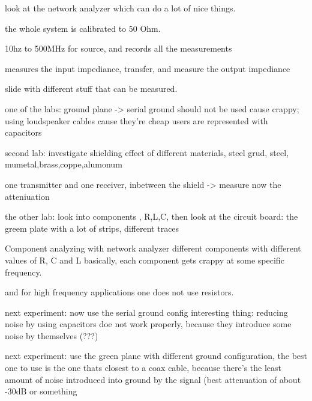 




look at the network analyzer which can do a lot of nice things.

the whole system is calibrated to 50 Ohm.

10hz to 500MHz for source, and records all the measurements

measures the input impediance, transfer, and measure the output impediance

slide with different stuff that can be measured.

one of the labs:
ground plane -> serial ground should not be used cause crappy; using loudspeaker cables cause they're cheap
users are represented with capacitors

second lab:
investigate shielding effect of different materials, steel grud, steel, mumetal,brass,coppe,alumonum

one transmitter and one receiver, inbetween the shield -> measure now the atteniuation

the other lab:
look into components , R,L,C, then look at the circuit board:
the greem plate with a lot of strips, different traces



Component analyzing with network analyzer
different components with different values of R, C and L
basically, each component gets crappy at some specific frequency.

and for high frequency applications one does not use resistors.



next experiment:
now use the serial ground config
interesting thing: reducing noise by using capacitors doe not work properly, because they introduce some noise by themselves (???)

next experiment:
use the green plane with different ground configuration, the best one to use is the one thats closest to a coax cable, because there's the least amount of noise introduced into ground by the signal (best attenuation of about -30dB or something



